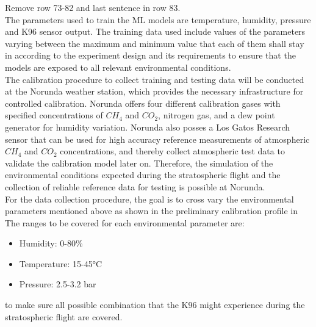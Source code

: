 Remove row 73-82 and last sentence in row 83.\\

The parameters used to train the ML models are temperature, humidity, pressure and K96 sensor output. The training data used include values of the parameters varying between the maximum and minimum value that each of them shall stay in according to the experiment design and its requirements to ensure that the models are exposed to all relevant environmental conditions. \\
The calibration procedure to collect training and testing data will be conducted at the Norunda weather station, which provides the necessary infrastructure for controlled calibration. Norunda offers four different calibration gases with specified concentrations of $CH_4$ and $CO_2$, nitrogen gas, and a dew point generator for humidity variation. Norunda also posses a Los Gatos Research sensor that can be used for high accuracy reference measurements of atmospheric $CH_4$ and $CO_2$ concentrations, and thereby collect atmospheric test data to validate the calibration model later on.
Therefore, the simulation of the environmental conditions expected during the stratospheric flight and the collection of reliable reference data for testing is possible at Norunda.\\
For the data collection procedure, the goal is to cross vary the environmental parameters mentioned above as shown in the preliminary calibration profile in 
The ranges to be covered for each environmental parameter are:
\begin{itemize}
  \item Humidity: 0-80\%
  \item Temperature: 15-45°C
  \item Pressure: 2.5-3.2 bar
\end{itemize}   
to make sure all possible combination that the K96 might experience during the stratospheric flight are covered.
